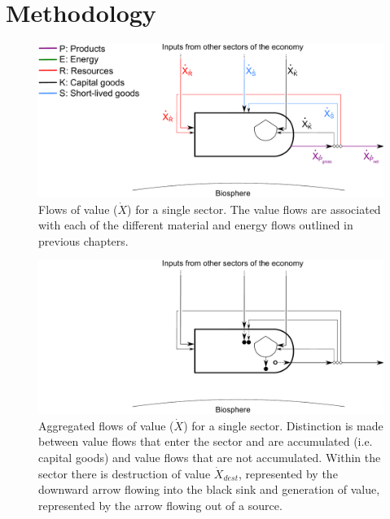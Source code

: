 \section{Methodology}
\label{sec:Value_Methodology}

\begin{figure}[!ht]
\centering
\includegraphics[width=0.8\linewidth]{Part_3/Chapter_Values/images/PERKS_basic_unit_value_all.pdf}
\caption[Flows of value for a single sector]{Flows of value ($\dot{X}$) for a single sector. The value flows are associated with each of the different material and energy flows outlined in previous chapters.}
\label{fig:basic_value} 
\end{figure}

\begin{figure}[!ht]
\centering
\includegraphics[width=0.8\linewidth]{Part_3/Chapter_Values/images/PERKS_basic_unit_value.pdf}
\caption[Aggregated flows of value for a single sector]{Aggregated flows of value ($\dot{X}$) for a single sector. Distinction is made between value flows that enter the sector and are accumulated (i.e. capital goods) and value flows that are not accumulated. Within the sector there is destruction of value $\dot{X}_{dest}$, represented by the downward arrow flowing into the black sink and generation of value, represented by the arrow flowing out of a source. }
\label{fig:basic_value_aggregated} 
\end{figure}

